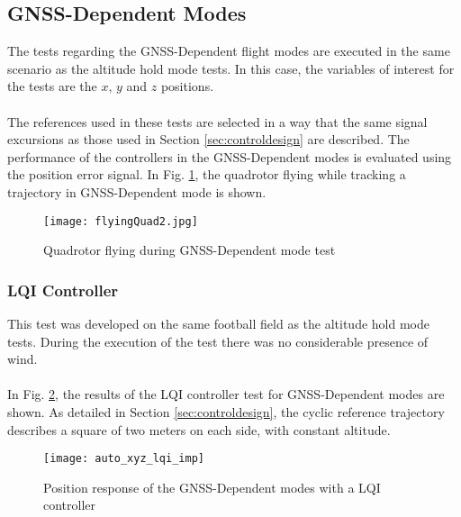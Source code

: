 \subsection{GNSS-Dependent Modes}
The tests regarding the GNSS-Dependent flight modes are executed in the same scenario as the altitude hold mode tests. In this case, the variables of interest for the tests are the $ x $, $y $ and $ z $ positions.
\\\\
The references used in these tests are selected in a way that the same signal excursions as those used in Section \ref{sec:controldesign} are described. The performance of the controllers in the GNSS-Dependent modes is evaluated using the position error signal. In Fig. \ref{fig:autoquad}, the quadrotor flying while tracking a trajectory in GNSS-Dependent mode is shown.

\begin{figure}[h]
\begin{center}
\texttt{[image: flyingQuad2.jpg]}  
\caption{Quadrotor flying during GNSS-Dependent mode test} 
\label{fig:autoquad}
\end{center}
\end{figure}

\subsubsection{LQI Controller}
This test was developed on the same football field as the altitude hold mode tests. During the execution of the test there was no considerable presence of wind.
\\\\
In Fig. \ref{fig:auto_xyz_lqi_imp}, the results of the LQI controller test for GNSS-Dependent modes are shown. As detailed in Section \ref{sec:controldesign}, the cyclic reference trajectory describes a square of two meters on each side, with constant altitude. 
\begin{figure}[H]
	\begin{center}
	\texttt{[image: auto\_xyz\_lqi\_imp]}
	\caption{Position response of the GNSS-Dependent modes with a LQI controller}
	\label{fig:auto_xyz_lqi_imp}
	\end{center}
	\end{figure}
	
